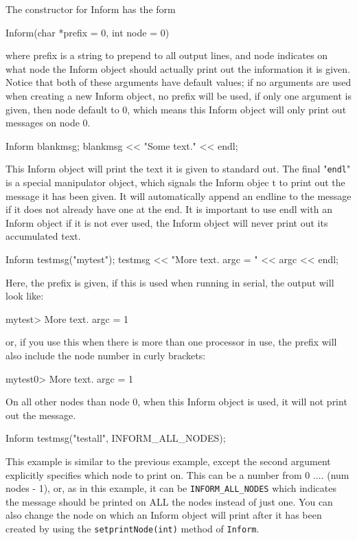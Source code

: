 The constructor for Inform has the form 
\begin{smallcode}
Inform(char *prefix = 0, int node = 0)
\end{smallcode}
where prefix is a string to prepend to all output lines, and node indicates on what node the Inform object should actually print out the information it is given. Notice that both of these arguments have default values; if no arguments are used when creating a new Inform object, no prefix will be used, if only one argument is given, then node default to 0, which means this Inform object will only print out messages on node 0.
\begin{smallcode}
Inform blankmsg; 
blankmsg << "Some text." << endl; 
\end{smallcode}
This Inform object will print the text it is given to standard out. The final "\texttt{endl}" is a special manipulator object, which signals the Inform objec t to print out the message it has been given. It will automatically append an endline to the message if it does not already have one at the end. It is important to use endl with an Inform object if it is not ever used, the Inform object will never print out its accumulated text.
\begin{smallcode}
Inform testmsg("mytest"); 
testmsg << "More text. argc = " << argc << endl; 
\end{smallcode}
Here, the prefix is given, if this is used when running in serial, the output will look like:
\begin{smallcode}
mytest> More text. argc = 1 
\end{smallcode}
or, if you use this when there is more than one processor in use, the prefix will also include the node number in curly brackets:
\begin{smallcode}
mytest{0}> More text. argc = 1 
\end{smallcode}
On all other nodes than node 0, when this Inform object is used, it will not print out the message.
\begin{smallcode}
Inform testmsg("testall", INFORM_ALL_NODES); 
\end{smallcode}
This example is similar to the previous example, except the second argument explicitly specifies which node to print on. This can be a number from 0 .... (num nodes - 1), or, as in this example, it can be \texttt{INFORM\_ALL\_NODES} which indicates the message should be printed on ALL the nodes instead of just one. You can also change the node on which an Inform object will print after it has been created by using the \texttt{setprintNode(int)} method of \texttt{Inform}. 

